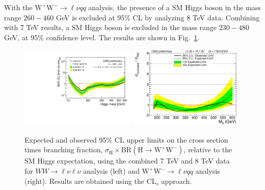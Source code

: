 \documentclass{PoS}
\newcommand{\Hi}{\ensuremath{\mathrm{H}}}
\newcommand{\W}{\ensuremath{\mathrm{W}}}
\newcommand{\WW}{\ensuremath{\W^+\W^-}}
\begin{document}
With the $\WW \to \ell\nu qq$ analysis, the presence of a SM Higgs
boson in the mass range $260-460$ GeV is excluded at 95\% CL by
analyzing 8 TeV data.  Combining with 7 TeV results, a SM Higgs boson
is excluded in the mass range $230-480$ GeV, at 95\% confidence
level. The results are shown in Fig.~\ref{fig:xsLim}.
\begin{figure}[htbp]
  \begin{center}
    \includegraphics[width=0.49\textwidth]{limits_nj_shape7TeV_cut8TeV-CLs-asymptotic_logx_logy.pdf}
    \includegraphics[width=0.49\textwidth]{limit_7and8tevcombined.pdf}
    \caption{Expected and observed 95\% CL upper limits on the cross
      section times branching fraction, $\sigma_{\Hi} \times
      \mathrm{BR}(\Hi \to \WW)$, relative to the SM Higgs expectation,
      using the combined 7 TeV and 8 TeV data for $WW \to
      \ell\nu\ell\nu$ analysis (left) and $\WW \to \ell\nu qq$
      analysis (right).  Results are obtained using the CL$_{s}$
      approach. \label{fig:xsLim}}
  \end{center}
\end{figure}
\end{document}
